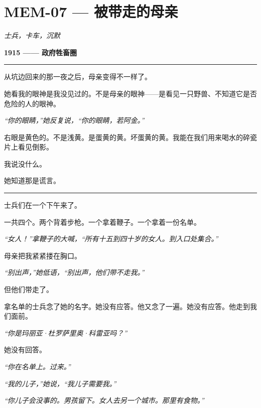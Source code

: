\section*{\textbf{MEM-07} --- 被带走的母亲}

\noindent \textit{士兵，卡车，沉默}

\noindent \textbf{1915 —— 政府牲畜圈}

\vspace{0.5em}\noindent\rule{\textwidth}{0.5pt}\vspace{0.5em}

\noindent 从坑边回来的那一夜之后，母亲变得不一样了。

\noindent 她看我的眼神是我没见过的。不是母亲的眼神——是看见一只野兽、不知道它是否危险的人的眼神。

\noindent \textit{“你的眼睛，”她反复说，“你的眼睛，若阿金。”}

\noindent 右眼是黄色的。不是浅黄。是蛋黄的黄。坏蛋黄的黄。我能在我们用来喝水的碎瓷片上看见倒影。

\noindent 我说没什么。

\noindent 她知道那是谎言。

\vspace{0.5em}\noindent\rule{\textwidth}{0.5pt}\vspace{0.5em}

\noindent 士兵们在一个下午来了。

\noindent 一共四个。两个背着步枪。一个拿着鞭子。一个拿着一份名单。

\noindent \textit{“女人！”拿鞭子的大喊，“所有十五到四十岁的女人。到入口处集合。”}

\noindent 母亲把我紧紧搂在胸口。

\noindent \textit{“别出声，”她低语，“别出声，他们带不走我。”}

\noindent 但他们带走了。

\noindent 拿名单的士兵念了她的名字。她没有应答。他又念了一遍。她没有应答。他走到我们面前。

\noindent \textit{“你是玛丽亚·杜罗萨里奥·科雷亚吗？”}

\noindent 她没有回答。

\noindent \textit{“你在名单上。过来。”}

\noindent \textit{“我的儿子，”她说，“我儿子需要我。”}

\noindent \textit{“你儿子会没事的。男孩留下。女人去另一个城市。那里有食物。”}

